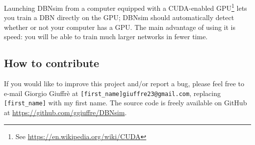 Launching DBNsim from a computer equipped with a CUDA-enabled GPU\footnote{See \url{https://en.wikipedia.org/wiki/CUDA}} lets you train a DBN directly on the GPU; DBNsim should automatically detect whether or not your computer has a GPU. The main advantage of using it is speed: you will be able to train much larger networks in fewer time.


\subsection{How to contribute}

If you would like to improve this project and/or report a bug, please feel free to e-mail Giorgio Giuffrè at \texttt{[first\_name]giuffre23@gmail.com}, replacing \texttt{[first\_name]} with my first name. The source code is freely available on GitHub at \url{https://github.com/ggiuffre/DBNsim}.
